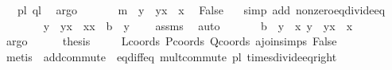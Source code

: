 \begin{isabellebody}
\ {}\ {}\ pl\ ql\ \isamarkupfalse%
\ argo\isanewline
\ \ \ \ \isamarkupfalse%
\ {}{\isacharcolon}{\kern0pt}\ {\isachardoublequoteopen}m\ {\isacharequal}{\kern0pt}\ {\isacharparenleft}{\kern0pt}y{}\ {\isacharminus}{\kern0pt}\ y{}{\isacharparenright}{\kern0pt}{\isacharslash}{\kern0pt}{\isacharparenleft}{\kern0pt}x{}\ {\isacharminus}{\kern0pt}\ x{}{\isacharparenright}{\kern0pt}{\isachardoublequoteclose}\ \isamarkupfalse%
\ False\ {}\ \isamarkupfalse%
\ {\isacharparenleft}{\kern0pt}simp\ add{\isacharcolon}{\kern0pt}\ nonzero{\isacharunderscore}{\kern0pt}eq{\isacharunderscore}{\kern0pt}divide{\isacharunderscore}{\kern0pt}eq{\isacharparenright}{\kern0pt}\isanewline
\ \ \ \ \isamarkupfalse%
\ {}{\isacharcolon}{\kern0pt}\ {\isachardoublequoteopen}\ {\isacharparenleft}{\kern0pt}y{}\ {\isacharminus}{\kern0pt}\ y{}{\isacharparenright}{\kern0pt}{\isacharslash}{\kern0pt}{\isacharparenleft}{\kern0pt}x{}\ {\isacharminus}{\kern0pt}\ x{}{\isacharparenright}{\kern0pt}{\isacharasterisk}{\kern0pt}x{}\ {\isacharplus}{\kern0pt}\ b\ {\isacharequal}{\kern0pt}\ y{}{\isachardoublequoteclose}\ \isamarkupfalse%
\ {}\ {}\ assms\ \isamarkupfalse%
\ auto\isanewline
\ \ \ \ \isamarkupfalse%
\ {}{\isacharcolon}{\kern0pt}\ {\isachardoublequoteopen}b\ {\isacharequal}{\kern0pt}\ y{}\ {\isacharminus}{\kern0pt}\ x{}{\isacharasterisk}{\kern0pt}\ {\isacharparenleft}{\kern0pt}y{}\ {\isacharminus}{\kern0pt}\ y{}{\isacharparenright}{\kern0pt}{\isacharslash}{\kern0pt}{\isacharparenleft}{\kern0pt}x{}\ {\isacharminus}{\kern0pt}\ x{}{\isacharparenright}{\kern0pt}{\isachardoublequoteclose}\ \isamarkupfalse%
\ {}\ \isamarkupfalse%
\ argo\isanewline
\ \ \ \ \isamarkupfalse%
\ {\isacharquery}{\kern0pt}thesis\ \isamarkupfalse%
\ {}\ {}\ {}\ Lcoords\ Pcoords\ Qcoords\ a{}join{\isachardot}{\kern0pt}simps\ False\ \isanewline
\ \ \ \ \isamarkupfalse%
\ {\isacharparenleft}{\kern0pt}metis\ \ add{\isachardot}{\kern0pt}commute\ \ eq{\isacharunderscore}{\kern0pt}diff{\isacharunderscore}{\kern0pt}eq\ mult{\isachardot}{\kern0pt}commute\ pl\ times{\isacharunderscore}{\kern0pt}divide{\isacharunderscore}{\kern0pt}eq{\isacharunderscore}{\kern0pt}right{\isacharparenright}{\kern0pt}\isanewline

\end{isabellebody}
